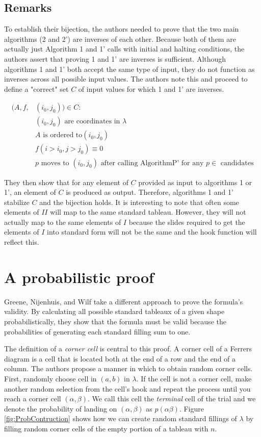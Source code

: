 \documentclass[11pt]{article}
\theoremstyle{definition}
\begin{document}
\subsection{Remarks}
To establish their bijection, the authors needed to prove that the two main algorithms (2 and 2') are inverses of each other. Because both of them are actually just Algorithm 1 and 1' calls with initial and halting conditions, the authors assert that proving 1 and 1' are inverses is sufficient. Although algorithms 1 and 1' both accept the same type of input, they do not function as inverses across all possible input values. The authors note this and proceed to define a "correct" set $C$ of input values for which 1 and 1' are inverses.

\begin{equation*}
\begin{split}
    (A,f,&(i_0,j_0)) \in C: \\
      & (i_0,j_0) \text{ are coordinates in } \lambda \\
      & A \text{ is ordered to} (i_0,j_0) \\
      & f(i > i_0,j > j_0) \equiv 0 \\
      & p \text{ moves to } (i_0,j_0) \text{ after calling AlgorithmP' for any } p \in \text{ candidates}
\end{split}
\end{equation*}

They then show that for any element of $C$ provided as input to algorithms 1 or 1', an element of $C$ is produced as output. Therefore, algorithms 1 and 1' stabilize $C$ and the bijection holds. It is interesting to note that often some elements of $II$ will map to the same standard tableau. However, they will not actually map to the same elements of $I$ because the slides required to get the elements of $I$ into standard form will not be the same and the hook function will reflect this.


\section{A probabilistic proof}
Greene, Nijenhuis, and Wilf\cite{Greene} take a different approach to prove the formula's validity. By calculating all possible standard tableaux of a given shape probabilistically, they show that the formula must be valid because the probabilities of generating each standard filling sum to one. 

The definition of a \emph{corner cell} is central to this proof. A corner cell of a Ferrers diagram is a cell that is located both at the end of a row and the end of a column. The authors propose a manner in which to obtain random corner cells. First, randomly choose cell in $(a,b)$ in $\lambda$. If the cell is not a corner cell, make another random selection from the cell's hook and repeat the process until you reach a corner cell $(\alpha,\beta)$. We call this cell the \emph{terminal} cell of the trial and we denote the probability of landing on $(\alpha,\beta)$ as $p(\alpha\beta)$. 
Figure \ref{fig:ProbContruction} shows how we can create random standard fillings of $\lambda$ by filling random corner cells of the empty portion of a tableau with $n$.
\end{document}
